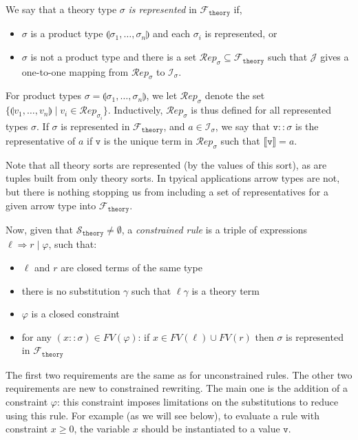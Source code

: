 \documentclass{lmcs}
\theoremstyle{theorem}\newtheorem{theorem}{Theorem}
\theoremstyle{theorem}\newtheorem{lemma}[theorem]{Lemma}
\theoremstyle{theorem}\newtheorem{corollary}[theorem]{Corollary}
\theoremstyle{definition}\newtheorem{definition}[theorem]{Definition}
\theoremstyle{definition}\newtheorem{example}[theorem]{Example}
\newcommand{\thF}{\mathcal{F}_{\mathtt{theory}}}
\newcommand{\thSorts}{\mathcal{S}_{\mathtt{theory}}}
\newcommand{\FV}{\mathit{FV}}
\newcommand{\FMV}{\mathit{MV}}
\newcommand{\I}{\mathcal{I}}
\newcommand{\J}{\mathcal{J}}
\newcommand{\Reps}[1]{\mathcal{R}\!\mathit{ep}_{#1}}
\newcommand{\atype}{\sigma}
\newcommand{\identifier}[1]{\mathtt{#1}}
\newcommand{\avalue}{\identifier{v}}
\newcommand{\avar}{x}
\newcommand{\Avar}{X}
\newcommand{\meta}[2]{#1\langle#2\rangle}
\newcommand{\tuple}[2]{\llparenthesis #1,\dots,#2 \rrparenthesis}
\newcommand{\arrz}{\Rightarrow}
\newcommand{\interpret}[1]{\llbracket #1 \rrbracket}
\begin{document}
We say that a theory type $\atype$ \emph{is represented} in $\thF$ if,
\begin{itemize}
\item $\atype$ is a product type $\tuple{\atype_1}{\atype_n}$ and each
  $\atype_i$ is represented, or
\item $\atype$ is not a product type and there is a set $\Reps{\atype} \subseteq
  \thF$ such that $\J$ gives a one-to-one mapping from $\Reps{\atype}$ to
  $\I_\atype$.
\end{itemize}
For product types $\atype = \tuple{\atype_1}{\atype_n}$, we let $\Reps{\atype}$
denote the set $\{ \tuple{v_1}{v_n} \mid v_i \in \Reps{\atype_i} \}$.
Inductively, $\Reps{\atype}$ is thus defined for all represented types $\atype$.
If $\atype$ is represented in $\thF$, and $a \in \I_\atype$, we say that
$\avalue :: \atype$ is the representative of $a$ if $\avalue$ is the unique term
in $\Reps{\atype}$ such that $\interpret{\avalue} = a$.

Note that all theory sorts are represented (by the values of this sort), as are
tuples built from only theory sorts.  In tpyical applications arrow types are
not, but there is nothing stopping us from including a set of representatives
for a given arrow type into $\thF$.

Now, given that $\thSorts \neq \emptyset$,
a \emph{constrained rule} is a triple of expressions $\ell \arrz r \mid
\varphi$, such that:
\begin{itemize}
\item $\ell$ and $r$ are closed terms of the same type
\item there is no substitution $\gamma$ such that $\ell\gamma$ is a theory term
\item $\varphi$ is a closed constraint
\item for any $(\avar :: \atype) \in \FV(\varphi)$:
  if $\avar \in \FV(\ell) \cup \FV(r)$ then $\atype$ is represented in
  $\thF$
\end{itemize}

The first two requirements are the same as for unconstrained rules.
%
The other two requirements are new to constrained rewriting.  The main one is
the addition of a constraint $\varphi$: this constraint imposes limitations on
the substitutions to reduce using this rule.  For example (as we will see
below), to evaluate a rule with constraint $\avar \geq 0$, the variable
$\avar$ should be instantiated to a value $\avalue$.
\end{document}
